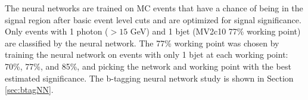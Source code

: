 The neural networks are trained on MC events that have a chance of being in the signal region after basic event level cuts and are optimized for signal significance.  Only events with 1 photon ($>15$ GeV) and 1 bjet (MV2c10 77\% working point) are classified by the neural network.  The 77\% working point was chosen by training the neural network on events with only 1 bjet at each working point: 70\%, 77\%, and 85\%, and picking the network and working point with the best estimated significance.  The b-tagging neural network study is shown in Section \ref{sec:btagNN}.

\begin{figure}[h!]
\centering
{}\hfil
{}
\vspace{-4.5mm}
\hfil

\end{figure}
